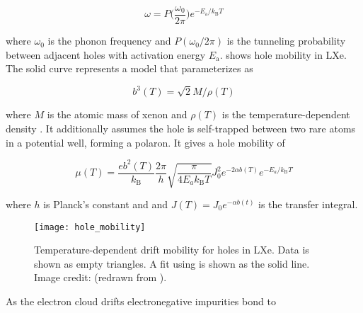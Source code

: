 \vspace{-20pt}

\begin{equation}
\omega = P \Big( \frac{\omega_0}{2 \pi} \Big) e^{-E_{\mathrm{a}} / k_{\mathrm{B}} T}
\end{equation}

\noindent where $\omega_0$ is the phonon frequency and $P(\omega_0 / 2 \pi)$ is the tunneling probability between adjacent holes with
activation energy $E_{\mathrm{a}}$.   shows hole mobility in
LXe.  The solid curve represents a model that parameterizes  as

\vspace{-15pt}

\begin{equation}
b^3(T) = \sqrt{2} M / \rho (T)
\end{equation}

\noindent where $M$ is the atomic mass of xenon and $\rho (T)$ is the temperature-dependent density .  It
additionally assumes the hole is self-trapped between two rare atoms in a potential well, forming a polaron.  It gives a hole mobility of

\vspace{-5pt}

\begin{equation}
\mu (T) = \frac{e b^2 (T)}{k_{\mathrm{B}}} \frac{2 \pi}{h} \sqrt{\frac{\pi}{4 E_a k_{\mathrm{B}} T}} J_0^2
e^{-2 \alpha b(T)} e^{-E_a / k_{\mathrm{B}} T}
\label{eq:importance_procedure_effects_charge_mobility_polaron}
\end{equation}

\noindent where $h$ is Planck's constant and and $J(T) = J_0 e^{-\alpha b(t)}$ is the transfer integral.

\begin{figure}
\centering
\texttt{[image: hole\_mobility]}
\caption{Temperature-dependent drift mobility for holes in LXe.  Data is shown as empty triangles.  A fit
using  is shown as the solid line.  Image credit: 
(redrawn from ).}
\label{fig:importance_procedure_effects_charge_hole_mobility}
\end{figure}

As the electron cloud drifts electronegative impurities bond to \electron


